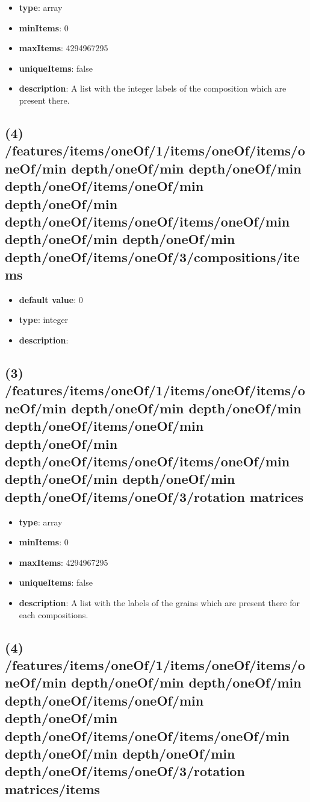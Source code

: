 \begin{itemize}[leftmargin=3em]\item {\bf type}: array
\item {\bf minItems}: 0
\item {\bf maxItems}: 4294967295
\item {\bf uniqueItems}: false
\item {\bf description}: A list with the integer labels of the composition which are present there.
\end{itemize}\subsection{(4) /features/items/oneOf/1/items/oneOf/items/oneOf/min depth/oneOf/min depth/oneOf/min depth/oneOf/items/oneOf/min depth/oneOf/min depth/oneOf/items/oneOf/items/oneOf/min depth/oneOf/min depth/oneOf/min depth/oneOf/items/oneOf/3/compositions/items}
\begin{itemize}[leftmargin=4em]\item {\bf default value}: 0
\item {\bf type}: integer
\item {\bf description}: 
\end{itemize}\subsection{(3) /features/items/oneOf/1/items/oneOf/items/oneOf/min depth/oneOf/min depth/oneOf/min depth/oneOf/items/oneOf/min depth/oneOf/min depth/oneOf/items/oneOf/items/oneOf/min depth/oneOf/min depth/oneOf/min depth/oneOf/items/oneOf/3/rotation matrices}
\begin{itemize}[leftmargin=3em]\item {\bf type}: array
\item {\bf minItems}: 0
\item {\bf maxItems}: 4294967295
\item {\bf uniqueItems}: false
\item {\bf description}: A list with the labels of the grains which are present there for each compositions.
\end{itemize}\subsection{(4) /features/items/oneOf/1/items/oneOf/items/oneOf/min depth/oneOf/min depth/oneOf/min depth/oneOf/items/oneOf/min depth/oneOf/min depth/oneOf/items/oneOf/items/oneOf/min depth/oneOf/min depth/oneOf/min depth/oneOf/items/oneOf/3/rotation matrices/items}
